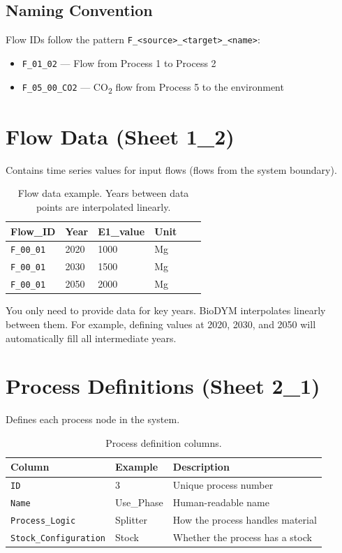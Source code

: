 \subsection{Naming Convention}

Flow IDs follow the pattern \texttt{F\_<source>\_<target>\_<name>}:
\begin{itemize}
  \item \texttt{F\_01\_02} --- Flow from Process 1 to Process 2
  \item \texttt{F\_05\_00\_CO2} --- CO\textsubscript{2} flow from Process 5 to the environment
\end{itemize}

\section{Flow Data (Sheet 1\_2)}

Contains time series values for input flows (flows from the system boundary).

\begin{table}[h]
\centering
\begin{tabular}{llllll}
\toprule
\textbf{Flow\_ID} & \textbf{Year} & \textbf{E1\_value} & \textbf{Unit} \\
\midrule
\texttt{F\_00\_01} & 2020 & 1000 & Mg \\
\texttt{F\_00\_01} & 2030 & 1500 & Mg \\
\texttt{F\_00\_01} & 2050 & 2000 & Mg \\
\bottomrule
\end{tabular}
\caption{Flow data example. Years between data points are interpolated linearly.}
\end{table}

\begin{tipbox}
You only need to provide data for key years. BioDYM interpolates linearly between them. For example, defining values at 2020, 2030, and 2050 will automatically fill all intermediate years.
\end{tipbox}

\section{Process Definitions (Sheet 2\_1)}

Defines each process node in the system.

\begin{table}[h]
\centering
\begin{tabular}{llp{5.5cm}}
\toprule
\textbf{Column} & \textbf{Example} & \textbf{Description} \\
\midrule
\texttt{ID} & 3 & Unique process number \\
\texttt{Name} & Use\_Phase & Human-readable name \\
\texttt{Process\_Logic} & Splitter & How the process handles material \\
\texttt{Stock\_Configuration} & Stock & Whether the process has a stock \\
\bottomrule
\end{tabular}
\caption{Process definition columns.}
\end{table}

